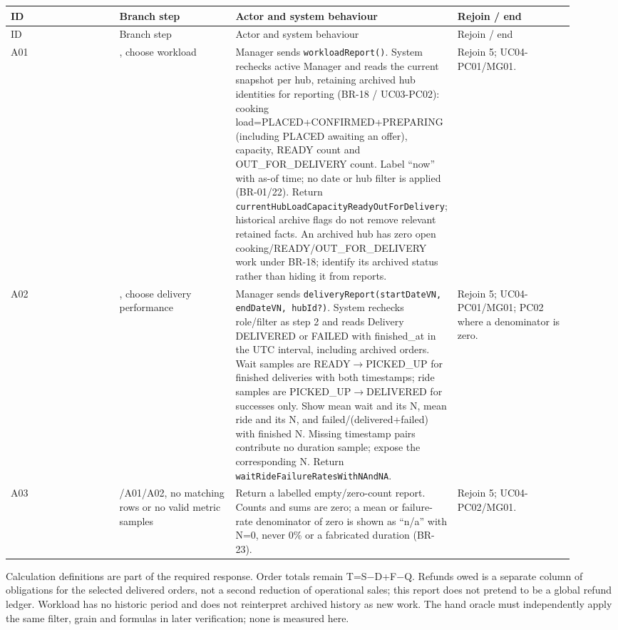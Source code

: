\begin{longtable}{>{\raggedright\arraybackslash}p{0.2300\linewidth}>{\raggedright\arraybackslash}p{0.2300\linewidth}>{\raggedright\arraybackslash}p{0.2300\linewidth}>{\raggedright\arraybackslash}p{0.2300\linewidth}}
ID & Branch step & Actor and system behaviour & Rejoin / end \\
\hline\endfirsthead
ID & Branch step & Actor and system behaviour & Rejoin / end \\
\hline\endhead
A01 & 1, choose workload & Manager sends \texttt{workloadReport()}. System rechecks active Manager and reads the current snapshot per hub, retaining archived hub identities for reporting (BR-18 / UC03-PC02): cooking load=PLACED+CONFIRMED+PREPARING (including PLACED awaiting an offer), capacity, READY count and OUT\_FOR\_DELIVERY count. Label ``now'' with as-of time; no date or hub filter is applied (BR-01/22). Return \texttt{currentHubLoadCapacityReadyOutForDelivery}; historical archive flags do not remove relevant retained facts. An archived hub has zero open cooking/READY/OUT\_FOR\_DELIVERY work under BR-18; identify its archived status rather than hiding it from reports. & Rejoin 5; UC04-PC01/MG01. \\
A02 & 1, choose delivery performance & Manager sends \texttt{deliveryReport(startDateVN, endDateVN, hubId?)}. System rechecks role/filter as step 2 and reads Delivery DELIVERED or FAILED with finished\_at in the UTC interval, including archived orders. Wait samples are READY\ensuremath{\rightarrow}PICKED\_UP for finished deliveries with both timestamps; ride samples are PICKED\_UP\ensuremath{\rightarrow}DELIVERED for successes only. Show mean wait and its N, mean ride and its N, and failed/(delivered+failed) with finished N. Missing timestamp pairs contribute no duration sample; expose the corresponding N. Return \texttt{waitRideFailureRatesWithNAndNA}. & Rejoin 5; UC04-PC01/MG01; PC02 where a denominator is zero. \\
A03 & 3/A01/A02, no matching rows or no valid metric samples & Return a labelled empty/zero-count report. Counts and sums are zero; a mean or failure-rate denominator of zero is shown as ``n/a'' with N=0, never 0\% or a fabricated duration (BR-23). & Rejoin 5; UC04-PC02/MG01. \\
\end{longtable}
Calculation definitions are part of the required response. Order totals remain T=S\ensuremath{-}D+F\ensuremath{-}Q. Refunds owed is a separate column of obligations for the selected delivered orders, not a second reduction of operational sales; this report does not pretend to be a global refund ledger. Workload has no historic period and does not reinterpret archived history as new work. The hand oracle must independently apply the same filter, grain and formulas in later verification; none is measured here.

